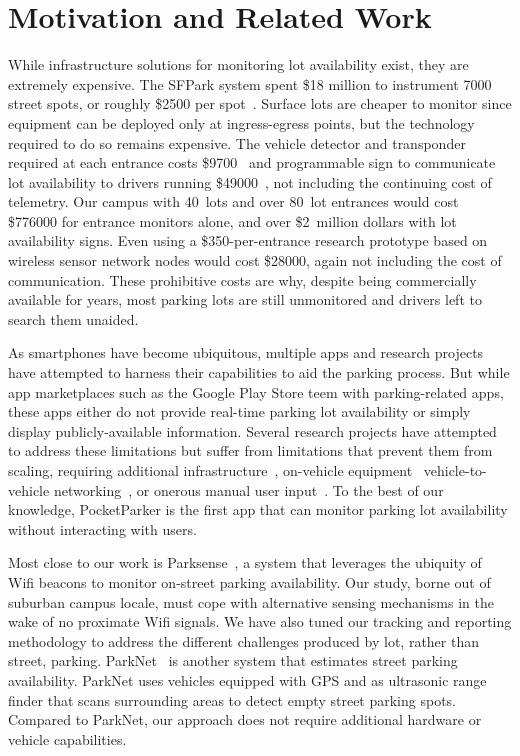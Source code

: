 \section{Motivation and Related Work}
While infrastructure solutions for monitoring lot availability exist, they
are extremely expensive. The SFPark system spent \$18 million to instrument
\num{7000} street spots, or roughly \$\num{2500} per spot~\cite{sfpark}.
Surface lots are cheaper to monitor since equipment can be deployed only at
ingress-egress points, but the technology required to do so remains
expensive. The vehicle detector and transponder required at each entrance
costs \$\num{9700}~\cite{car-detect} and programmable sign to communicate lot
availability to drivers running \$\num{49000}~\cite{mstp-park}, not including
the continuing cost of telemetry. Our campus with 40~lots and over 80~lot
entrances would cost \$\num{776000} for entrance monitors alone, and over
\$2~million dollars with lot availability signs. Even using a
\$\num{350}-per-entrance research prototype based on wireless sensor network
nodes would cost \$\num{28000}, again not including the cost of
communication. These prohibitive costs are why, despite being commercially
available for years, most parking lots are still unmonitored and drivers left
to search them unaided.

As smartphones have become ubiquitous, multiple apps and research projects
have attempted to harness their capabilities to aid the parking process. But
while app marketplaces such as the Google Play Store teem with
parking-related apps, these apps either do not provide real-time parking lot
availability or simply display publicly-available information. Several
research projects have attempted to address these limitations but suffer from
limitations that prevent them from scaling, requiring additional
infrastructure~\cite{5062057}, on-vehicle equipment~\cite{Mathur:2010:PDS}
vehicle-to-vehicle networking~\cite{Delot:2009:CRP, Mathur:2010:PDS}, or
onerous manual user input~\cite{Chen:2012:COS}. To the best of our knowledge,
PocketParker is the first app that can monitor parking lot availability
without interacting with users.

Most close to our work is Parksense~\cite{Nawaz:2013:PSB}, a system that
leverages the ubiquity of Wifi beacons to monitor on-street parking
availability. Our study, borne out of suburban campus locale, must cope with
alternative sensing mechanisms in the wake of no proximate Wifi signals. We
have also tuned our tracking and reporting methodology to address the
different challenges produced by lot, rather than street, parking.
ParkNet~\cite{Mathur:2010:PDS} is another system that estimates street
parking availability. ParkNet uses vehicles equipped with GPS and as
ultrasonic range finder that scans surrounding areas to detect empty street
parking spots. Compared to ParkNet, our approach does not require additional
hardware or vehicle capabilities.

